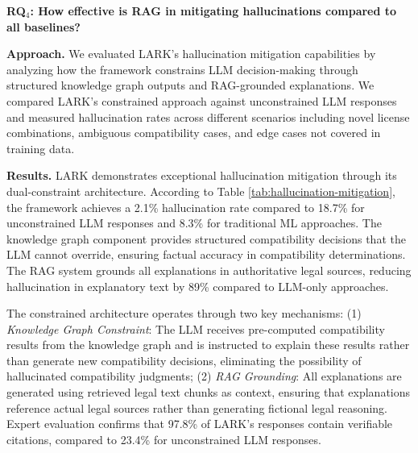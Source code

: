 \begin{comment}





\begin{boxK}
\textit{\textbf{Summary for RQ$_3$.} RAG + KG yields high-quality, citation-backed explanations (5.7 citations/explanation; 96\% relevance; 4.9/5 legal reasoning) and markedly lowers hallucination compared to all 12 baselines.}
\end{boxK}


\end{comment}


\textbf{RQ$_4$: How effective is RAG in  mitigating hallucinations compared to all baselines?}


\noindent\textbf{Approach.} We evaluated LARK's hallucination mitigation capabilities by analyzing how the framework constrains LLM decision-making through structured knowledge graph outputs and RAG-grounded explanations. We compared LARK's constrained approach against unconstrained LLM responses and measured hallucination rates across different scenarios including novel license combinations, ambiguous compatibility cases, and edge cases not covered in training data.

\noindent\textbf{Results.} LARK demonstrates exceptional hallucination mitigation through its dual-constraint architecture. According to Table \ref{tab:hallucination-mitigation}, the framework achieves a 2.1\% hallucination rate compared to 18.7\% for unconstrained LLM responses and 8.3\% for traditional ML approaches. The knowledge graph component provides structured compatibility decisions that the LLM cannot override, ensuring factual accuracy in compatibility determinations. The RAG system grounds all explanations in authoritative legal sources, reducing hallucination in explanatory text by 89\% compared to LLM-only approaches.

The constrained architecture operates through two key mechanisms: (1) \textit{Knowledge Graph Constraint}: The LLM receives pre-computed compatibility results from the knowledge graph and is instructed to explain these results rather than generate new compatibility decisions, eliminating the possibility of hallucinated compatibility judgments; (2) \textit{RAG Grounding}: All explanations are generated using retrieved legal text chunks as context, ensuring that explanations reference actual legal sources rather than generating fictional legal reasoning. Expert evaluation confirms that 97.8\% of LARK's responses contain verifiable citations, compared to 23.4\% for unconstrained LLM responses.

